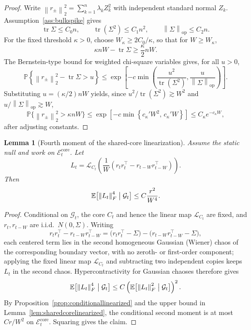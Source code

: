 \documentclass[11pt]{article}
\theoremstyle{tightplain}
\newtheorem{lemma}[theorem]{Lemma}
\theoremstyle{tightdef}
\DeclareMathOperator{\tr}{tr}
\DeclareMathOperator{\op}{op}
\newcommand{\E}{\mathbb E}
\newcommand{\Prob}{\mathbb P}
\newcommand{\norm}[1]{\left\lVert #1 \right\rVert}
\begin{document}
\begin{proof}
Write $\norm{r_\pm}_2^2=\sum_{k=1}^n\lambda_k Z_k^2$ with independent standard
normal $Z_k$. Assumption~\ref{ass:bulkspike} gives
\[
\tr\Sigma\le C_0 n,
\qquad
\tr(\Sigma^2)\le C_1 n^2,
\qquad
\norm{\Sigma}_{\op}\le C_2 n.
\]
For the fixed threshold $\kappa>0$, choose $W_\kappa\ge 2C_0/\kappa$, so that
for $W\ge W_\kappa$,
\[
\kappa nW-\tr\Sigma\ge \frac{\kappa}{2}nW.
\]
The Bernstein-type bound for weighted chi-square variables
\cite{LaurentMassart2000,HsuKakadeZhang2012,Vershynin2018} gives, for all $u>0$,
\[
\Prob\left\{\norm{r_\pm}_2^2-\tr\Sigma>u\right\}
\le
\exp\left[-c\min\left(\frac{u^2}{\tr(\Sigma^2)},\frac{u}{\norm{\Sigma}_{\op}}\right)\right].
\]
Substituting $u=(\kappa/2)nW$ yields, since $u^2/\tr(\Sigma^2)\gtrsim W^2$ and
$u/\norm{\Sigma}_{\op}\gtrsim W$,
\[
\Prob\bigl\{\norm{r_\pm}_2^2>\kappa nW\bigr\}
\le
\exp\left[-c\min\left\{c_\kappa' W^2,\,c_\kappa' W\right\}\right]
\le
C_\kappa e^{-c_\kappa W},
\]
after adjusting constants.
\end{proof}

\begin{lemma}[Fourth moment of the shared-core linearization]\label{lem:sharedcorefourth}
Assume the static null and work on $\mathcal E_t^{\mathrm{core}}$. Let
\[
L_t=\mathcal L_{C_t}\left(\frac1W(r_t r_t^\top-r_{t-W}r_{t-W}^\top)\right).
\]
Then
\[
\E\bigl[\norm{L_t}_F^4\bigm|\mathcal G_t\bigr]
\le
C\frac{r^2}{W^4}.
\]
\end{lemma}

\begin{proof}
Conditional on $\mathcal G_t$, the core $C_t$ and hence the linear map
$\mathcal L_{C_t}$ are fixed, and $r_t,r_{t-W}$ are i.i.d.\ $N(0,\Sigma)$. Writing
\[
r_t r_t^\top-r_{t-W}r_{t-W}^\top
=\bigl(r_t r_t^\top-\Sigma\bigr)-\bigl(r_{t-W}r_{t-W}^\top-\Sigma\bigr),
\]
each centered term lies in the second homogeneous Gaussian (Wiener) chaos of the
corresponding boundary vector, with no zeroth- or first-order component; applying
the fixed linear map $\mathcal L_{C_t}$ and subtracting two independent copies
keeps $L_t$ in the second chaos. Hypercontractivity for Gaussian chaoses
\cite{Nelson1973,Janson1997} therefore gives
\[
\E\bigl[\norm{L_t}_F^4\bigm|\mathcal G_t\bigr]
\le
C\left(\E\bigl[\norm{L_t}_F^2\bigm|\mathcal G_t\bigr]\right)^2.
\]
By Proposition~\ref{prop:conditionallinearized} and the upper bound in
Lemma~\ref{lem:sharedcorelinearized}, the conditional second moment is at most
$Cr/W^2$ on $\mathcal E_t^{\mathrm{core}}$. Squaring gives the claim.
\end{proof}
\end{document}
